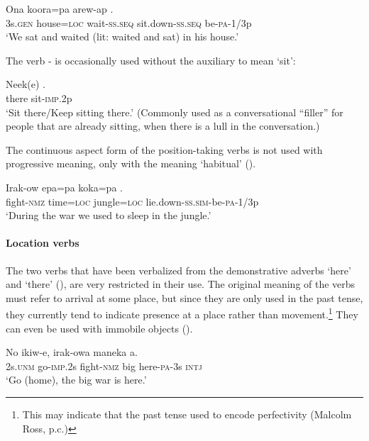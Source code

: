 \ea%
\label{ex:x274}
\gll Ona koora=pa arew-ap  . \\
3s.\textsc{gen} house=\textsc{loc} wait-\textsc{ss}.\textsc{seq} sit.down-\textsc{ss}.\textsc{seq} be-\textsc{pa}-1/3p\\
\glt`We sat and waited (lit: waited and sat) in his house.'
\z

The verb - is occasionally used without the auxiliary to mean `sit': 

\ea%
\label{ex:x1824}
\gll Neek(e) . \\
there sit-\textsc{imp}.2p\\
\glt`Sit there/Keep sitting there.' (Commonly used as a conversational ``filler'' for people that are already sitting, when there is a lull in the conversation.)
\z

The continuous aspect form of the position-taking verbs is not used with progressive meaning, only with the meaning `habitual' (). 

\ea%
\label{ex:x275}
\gll Irak-ow epa=pa koka=pa . \\
fight-\textsc{nmz} time=\textsc{loc} jungle=\textsc{loc} lie.down-\textsc{ss}.\textsc{sim}-be-\textsc{pa}-1/3p \\
\glt`During the war we used to sleep in the jungle.'
\z

\paragraph[Location verbs]{Location verbs}
{}
The two verbs that have been verbalized from the demonstrative adverbs  `here' and  `there' (), are very restricted in their use. The original meaning of the verbs must refer to arrival at some place, but since they are only used in the past tense, they currently tend to indicate presence at a place rather than movement.\footnote{This may indicate that the past tense used to encode perfectivity (Malcolm Ross, p.c.)} They can even be used with immobile objects (). 

\ea%
\label{ex:x1270}
\gll No ikiw-e, irak-owa maneka \textstyleEmphasizedVernacularWords{-}\textstyleEmphasizedVernacularWords{-} a. \\
2s.\textsc{unm} go-\textsc{imp}.2s fight-\textsc{nmz} big here-\textsc{pa}-3s \textsc{intj}\\
\glt`Go (home), the big war is here.'
\z

